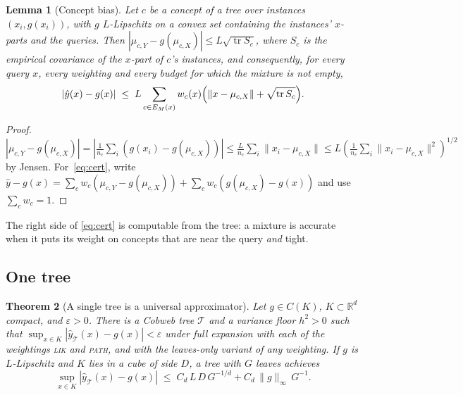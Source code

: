 \documentclass[11pt]{article}
\newtheorem{theorem}{Theorem}
\newtheorem{lemma}[theorem]{Lemma}
\theoremstyle{definition}
\theoremstyle{remark}
\newcommand{\R}{\mathbb{R}}
\newcommand{\T}{\mathcal{T}}
\newcommand{\hy}{\hat{y}}
\newcommand{\tr}{\operatorname{tr}}
\begin{document}
\begin{lemma}[Concept bias]\label{lem:bias}
Let $c$ be a concept of a tree over instances $(x_i,g(x_i))$, with $g$ $L$-Lipschitz on a
convex set containing the instances' $x$-parts and the queries.
Then $|\mu_{c,Y}-g(\mu_{c,X})|\le L\sqrt{\tr S_c}$, where $S_c$ is the empirical
covariance of the $x$-part of $c$'s instances, and consequently, for every query $x$,
every weighting and every budget for which the mixture is not empty,
\begin{equation}\label{eq:cert}
  |\hy(x)-g(x)|\;\le\;L\sum_{c\in E_M(x)}w_c(x)\Bigl(\|x-\mu_{c,X}\|+\sqrt{\tr S_c}\Bigr).
\end{equation}
\end{lemma}
\begin{proof}
$|\mu_{c,Y}-g(\mu_{c,X})|=|\tfrac{1}{n_c}\sum_i(g(x_i)-g(\mu_{c,X}))|\le
\tfrac{L}{n_c}\sum_i\|x_i-\mu_{c,X}\|\le L(\tfrac1{n_c}\sum_i\|x_i-\mu_{c,X}\|^2)^{1/2}$
by Jensen.  For~\eqref{eq:cert}, write $\hy-g(x)=\sum_c w_c(\mu_{c,Y}-g(\mu_{c,X}))+
\sum_c w_c(g(\mu_{c,X})-g(x))$ and use $\sum_cw_c=1$.
\end{proof}

The right side of \eqref{eq:cert} is computable from the tree: a mixture is accurate
when it puts its weight on concepts that are near the query \emph{and} tight.

\subsection{One tree}

\begin{theorem}[A single tree is a universal approximator]\label{thm:single}
Let $g\in C(K)$, $K\subset\R^d$ compact, and $\varepsilon>0$.  There is a Cobweb tree $\T$
and a variance floor $h^2>0$ such that $\sup_{x\in K}|\hy_\T(x)-g(x)|<\varepsilon$ under
full expansion with each of the weightings \textsc{lik} and \textsc{path}, and with the
leaves-only variant of any weighting.  If $g$ is $L$-Lipschitz and $K$ lies in a cube of side $D$, a tree with $G$ leaves
achieves
\begin{equation}\label{eq:singlerate}
  \sup_{x\in K}|\hy_\T(x)-g(x)|\;\le\;C_{d}\,L\,D\,G^{-1/d}+C_{d}\,\|g\|_\infty\,G^{-1}.
\end{equation}
\end{theorem}
\end{document}
